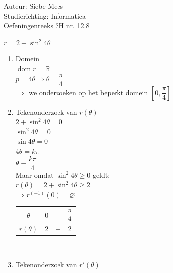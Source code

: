 \documentclass[a4paper]{article}
\begin{document}
  
\noindent \large Auteur: Siebe Mees \\
\noindent \large Studierichting: Informatica\\
\noindent \large Oefeningenreeks 3H nr. 12.8\\

\medskip

\normalsize

$r=2+\sin^2 4\theta$\\

\begin{enumerate}

\item Domein\\

$\operatorname{dom} r=\mathbb{R}$\\

$p=4\theta \Rightarrow \theta=\dfrac{\pi}{4}$\\

$\Rightarrow$ we onderzoeken op het beperkt domein $\left[0,\dfrac{\pi}{4}\right]$\\

\item Tekenonderzoek van $r(\theta)$\\

$2+\sin^2 4\theta=0$\\

$\sin^2 4\theta=0$\\

$\sin 4\theta=0$\\

$4\theta=k\pi$\\

$\theta=\dfrac{k\pi}{4}$\\

Maar omdat $\sin^2 4\theta\geq 0$ geldt:\\

$r(\theta)=2+\sin^2 4\theta\geq 2$\\

$\Rightarrow r^{(-1)}(0)=\varnothing$\\

\begin{tabular}{c|ccc}
$\theta$ & $0$ &  & $\dfrac{\pi}{4}$ \\ \hline
$r(\theta)$ & $2$ & $+$ & $2$
\end{tabular}\\

\item Tekenonderzoek van $r'(\theta)$\\


\end{enumerate}
\end{document}
